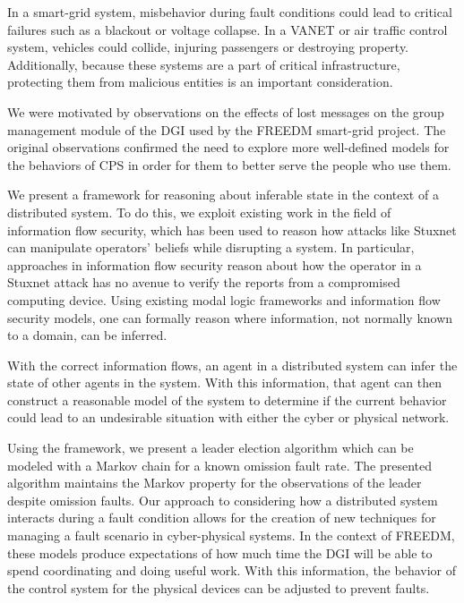 In a smart-grid system, misbehavior during fault conditions could lead to critical failures such as a blackout or voltage collapse.
In a \ac{VANET} or air traffic control system, vehicles could collide, injuring passengers or destroying property.
Additionally, because these systems are a part of critical infrastructure, protecting them from malicious entities is an important consideration.

We were motivated by observations on the effects of lost messages on the group management module of the \ac{DGI} used by the \ac{FREEDM} smart-grid project.
The original observations confirmed the need to explore more well-defined models for the behaviors of \ac{CPS} in order for them to better serve the people who use them.

We present a framework for reasoning about inferable state in the context of a distributed system.
To do this, we exploit existing work in the field of information flow security, which has been used to reason how attacks like Stuxnet can manipulate operators' beliefs while disrupting a system\cite{STUXNET}.
In particular, approaches in information flow security reason about how the operator in a Stuxnet attack has no avenue to verify the reports from a compromised computing device.
Using existing modal logic frameworks and information flow security models\cite{Howser2012}\cite{STUXNET}\cite{Howser2013}, one can formally reason where information, not normally known to a domain, can be inferred.

With the correct information flows, an agent in a distributed system can infer the state of other agents in the system.
With this information, that agent can then construct a reasonable model of the system to determine if the current behavior could lead to an undesirable situation with either the cyber or physical network.

Using the framework, we present a leader election algorithm which can be modeled with a Markov chain for a known omission fault\cite{OMISSIONFAILURES} rate.
The presented algorithm maintains the Markov property for the observations of the leader despite omission faults.
Our approach to considering how a distributed system interacts during a fault condition allows for the creation of new techniques for managing a fault scenario in cyber-physical systems.
In the context of \ac{FREEDM}, these models produce expectations of how much time the DGI will be able to spend coordinating and doing useful work.
With this information, the behavior of the control system for the physical devices can be adjusted to prevent faults.

